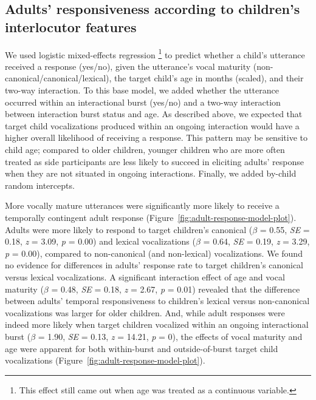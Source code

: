 \documentclass[
  man]{apa6}
\begin{document}
\hypertarget{adults-responsiveness-according-to-childrens-interlocutor-features}{%
\subsection{Adults' responsiveness according to children's interlocutor features}\label{adults-responsiveness-according-to-childrens-interlocutor-features}}

We used logistic mixed-effects regression \footnote{This effect still came out when age was treated as a continuous variable.} to predict whether a child's utterance received a response (yes/no), given the utterance's vocal maturity (non-canonical/canonical/lexical), the target child's age in months (scaled), and their two-way interaction. To this base model, we added whether the utterance occurred within an interactional burst (yes/no) and a two-way interaction between interaction burst status and age. As described above, we expected that target child vocalizations produced within an ongoing interaction would have a higher overall likelihood of receiving a response. This pattern may be sensitive to child age; compared to older children, younger children who are more often treated as side participants are less likely to succeed in eliciting adults' response when they are not situated in ongoing interactions. Finally, we added by-child random intercepts.

More vocally mature utterances were significantly more likely to receive a temporally contingent adult response (Figure~\ref{fig:adult-response-model-plot}). Adults were more likely to respond to target children's canonical (\(\beta\) = 0.55, \emph{SE} = 0.18, \emph{z} = 3.09, \emph{p} = 0.00) and lexical vocalizations (\(\beta\) = 0.64, \emph{SE} = 0.19, \emph{z} = 3.29, \emph{p} = 0.00), compared to non-canonical (and non-lexical) vocalizations. We found no evidence for differences in adults' response rate to target children's canonical versus lexical vocalizations. A significant interaction effect of age and vocal maturity (\(\beta\) = 0.48, \emph{SE} = 0.18, \emph{z} = 2.67, \emph{p} = 0.01) revealed that the difference between adults' temporal responsiveness to children's lexical versus non-canonical vocalizations was larger for older children. And, while adult responses were indeed more likely when target children vocalized within an ongoing interactional burst (\(\beta\) = 1.90, \emph{SE} = 0.13, \emph{z} = 14.21, \emph{p} = 0), the effects of vocal maturity and age were apparent for both within-burst and outside-of-burst target child vocalizations (Figure~\ref{fig:adult-response-model-plot}).
\end{document}
